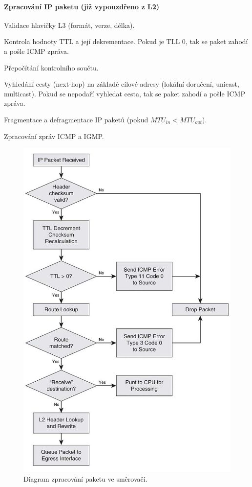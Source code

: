 \paragraph*{Zpracování IP paketu (již vypouzdřeno z L2)} \begin{compactenum}
    \item Validace hlavičky L3 (formát, verze, délka).
    \item Kontrola hodnoty TTL a její dekrementace. Pokud je TLL 0, tak se paket zahodí a pošle ICMP zpráva.
    \item Přepočítání kontrolního součtu.
    \item Vyhledání cesty (next-hop) na základě cílové adresy (lokální doručení, unicast, multicast). Pokud se nepodaří vyhledat cesta, tak se paket zahodí a pošle ICMP zpráva.
    \item Fragmentace a defragmentace IP paketů (pokud $MTU_{in} < MTU_{out}$).
    \item Zpracování zpráv ICMP a IGMP.
\end{compactenum}

\begin{figure}[H]
    \centering
    \includegraphics[width=0.75\linewidth]{cinnost_smerovace.png}
    \caption{Diagram zpracování paketu ve směrovači.}
\end{figure}

